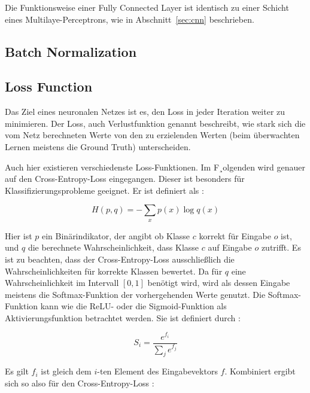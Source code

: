 Die Funktionsweise einer Fully Connected Layer ist identisch zu einer Schicht eines Multilaye-Perceptrons, wie in Abschnitt~\ref{sec:cnn} beschrieben.

\subsection{Batch Normalization}
\label{ssec:bn}

\subsection{Loss Function}
\label{ssec:loss}

Das Ziel eines neuronalen Netzes ist es, den Loss in jeder Iteration weiter zu minimieren. Der Loss, auch Verlustfunktion genannt beschreibt, wie stark sich die vom Netz berechneten Werte von den zu erzielenden Werten (beim überwachten Lernen meistens die Ground Truth) unterscheiden.

Auch hier existieren verschiedenste Loss-Funktionen. Im F¸olgenden wird genauer auf den Cross-Entropy-Loss eingegangen. Dieser ist besonders für Klassifizierungsprobleme geeignet. Er ist definiert als \cite{cs231n}:

\begin{equation}
H(p,q) = -\sum_x p(x)\log q(x)
\end{equation}


Hier ist $p$ ein Binärindikator, der angibt ob Klasse $c$ korrekt für Eingabe $o$ ist, und $q$ die berechnete Wahrscheinlichkeit, dass Klasse $c$ auf Eingabe $o$ zutrifft. Es ist zu beachten, dass der Cross-Entropy-Loss ausschließlich die Wahrscheinlichkeiten für korrekte Klassen bewertet. Da für $q$ eine Wahrscheinlichkeit im Intervall $[0,1]$ benötigt wird, wird als dessen Eingabe meistens die Softmax-Funktion der vorhergehenden Werte genutzt. Die Softmax-Funktion kann wie die ReLU- oder die Sigmoid-Funktion als Aktivierungsfunktion betrachtet werden. Sie ist definiert durch \cite{cs231n}:


\begin{equation}
S_i=\dfrac{e^{f_i}}{\sum_j e^{f_j}}
\end{equation}

Es gilt $f_i$ ist gleich dem $i$-ten Element des Eingabevektors $f$.
Kombiniert ergibt sich so also für den Cross-Entropy-Loss \cite{cs231n}:

